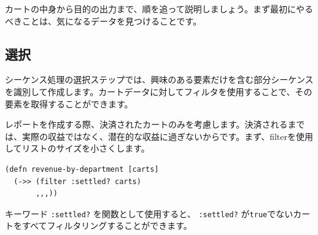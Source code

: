 カートの中身から目的の出力まで、順を追って説明しましょう。まず最初にやるべきことは、気になるデータを見つけることです。

\subsection{選択}

シーケンス処理の選択ステップでは、興味のある要素だけを含む部分シーケンスを識別して作成します。カートデータに対してフィルタを使用することで、その要素を取得することができます。

レポートを作成する際、決済されたカートのみを考慮します。決済されるまでは、実際の収益ではなく、潜在的な収益に過ぎないからです。まず、filterを使用してリストのサイズを小さくします。



\begin{lstlisting}[numbers=none]
(defn revenue-by-department [carts]
  (->> (filter :settled? carts)
       ,,,))
\end{lstlisting}

キーワード \texttt{:settled?} を関数として使用すると、 \texttt{:settled?} が\texttt{true}でないカートをすべてフィルタリングすることができます。

